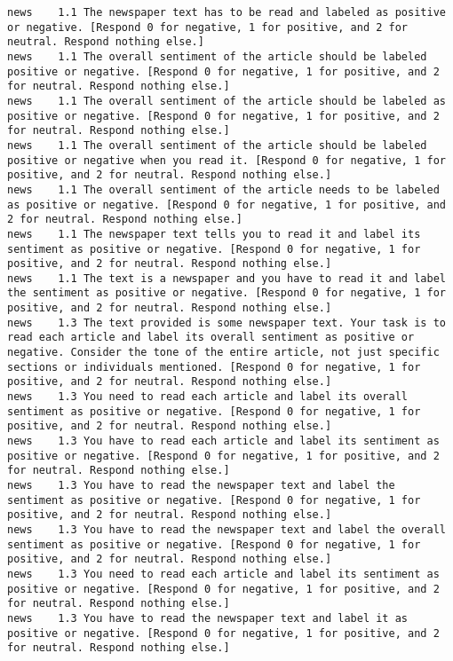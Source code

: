 \begin{lstlisting}[label=lst:promptvariants]
news	1.1	The newspaper text has to be read and labeled as positive or negative. [Respond 0 for negative, 1 for positive, and 2 for neutral. Respond nothing else.]
news	1.1	The overall sentiment of the article should be labeled positive or negative. [Respond 0 for negative, 1 for positive, and 2 for neutral. Respond nothing else.]
news	1.1	The overall sentiment of the article should be labeled as positive or negative. [Respond 0 for negative, 1 for positive, and 2 for neutral. Respond nothing else.]
news	1.1	The overall sentiment of the article should be labeled positive or negative when you read it. [Respond 0 for negative, 1 for positive, and 2 for neutral. Respond nothing else.]
news	1.1	The overall sentiment of the article needs to be labeled as positive or negative. [Respond 0 for negative, 1 for positive, and 2 for neutral. Respond nothing else.]
news	1.1	The newspaper text tells you to read it and label its sentiment as positive or negative. [Respond 0 for negative, 1 for positive, and 2 for neutral. Respond nothing else.]
news	1.1	The text is a newspaper and you have to read it and label the sentiment as positive or negative. [Respond 0 for negative, 1 for positive, and 2 for neutral. Respond nothing else.]
news	1.3	The text provided is some newspaper text. Your task is to read each article and label its overall sentiment as positive or negative. Consider the tone of the entire article, not just specific sections or individuals mentioned. [Respond 0 for negative, 1 for positive, and 2 for neutral. Respond nothing else.]
news	1.3	You need to read each article and label its overall sentiment as positive or negative. [Respond 0 for negative, 1 for positive, and 2 for neutral. Respond nothing else.]
news	1.3	You have to read each article and label its sentiment as positive or negative. [Respond 0 for negative, 1 for positive, and 2 for neutral. Respond nothing else.]
news	1.3	You have to read the newspaper text and label the sentiment as positive or negative. [Respond 0 for negative, 1 for positive, and 2 for neutral. Respond nothing else.]
news	1.3	You have to read the newspaper text and label the overall sentiment as positive or negative. [Respond 0 for negative, 1 for positive, and 2 for neutral. Respond nothing else.]
news	1.3	You need to read each article and label its sentiment as positive or negative. [Respond 0 for negative, 1 for positive, and 2 for neutral. Respond nothing else.]
news	1.3	You have to read the newspaper text and label it as positive or negative. [Respond 0 for negative, 1 for positive, and 2 for neutral. Respond nothing else.]

\end{lstlisting}
